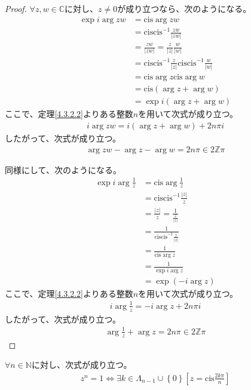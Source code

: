 \documentclass[dvipdfmx]{jsarticle}
\begin{document}
\begin{proof}
$\forall z,w \in \mathbb{C}$に対し、$z \neq 0$が成り立つなら、次のようになる。
\begin{align*}
\exp{i\arg{zw}} &= {\mathrm{cis}}{\arg{zw}}\\
&= {\mathrm{cis}}{{\mathrm{cis}}^{- 1}\frac{zw}{|zw|}}\\
&= \frac{zw}{|zw|} = \frac{z}{|z|}\frac{w}{|w|}\\
&= {\mathrm{cis}}{{\mathrm{cis}}^{- 1}\frac{z}{|z|}}{\mathrm{cis}}{{\mathrm{cis}}^{- 1}\frac{w}{|w|}}\\
&= {\mathrm{cis}}{\arg z}{\mathrm{cis}}{\arg w}\\
&= {\mathrm{cis}}\left( \arg z + \arg w \right)\\
&= \exp{i\left( \arg z + \arg w \right)}
\end{align*}
ここで、定理\ref{4.3.2.2}よりある整数$n$を用いて次式が成り立つ。
\begin{align*}
i\arg{zw} = i\left( \arg z + \arg w \right) + 2n\pi i
\end{align*}
したがって、次式が成り立つ。
\begin{align*}
\arg{zw} - \arg z - \arg w = 2n\pi \in 2\mathbb{Z}\pi
\end{align*}\par
同様にして、次のようになる。
\begin{align*}
\exp{i\arg\frac{1}{z}} &= {\mathrm{cis}}{\arg\frac{1}{z}}\\
&= {\mathrm{cis}}{{\mathrm{cis}}^{- 1}\frac{|z|}{z}}\\
&= \frac{|z|}{z} = \frac{1}{\frac{z}{|z|}}\\
&= \frac{1}{{\mathrm{cis}}{{\mathrm{cis}}^{- 1}\frac{z}{|z|}}}\\
&= \frac{1}{{\mathrm{cis}}{\arg z}}\\
&= \frac{1}{\exp{i\arg z}}\\
&= \exp\left( - i\arg z \right)
\end{align*}
ここで、定理\ref{4.3.2.2}よりある整数$n$を用いて次式が成り立つ。
\begin{align*}
i\arg\frac{1}{z} = - i\arg z + 2n\pi i
\end{align*}
したがって、次式が成り立つ。
\begin{align*}
\arg\frac{1}{z} + \arg z = 2n\pi \in 2\mathbb{Z}\pi
\end{align*}
\end{proof}
\begin{thm}\label{4.3.2.9} $\forall n \in \mathbb{N}$に対し、次式が成り立つ。
\begin{align*}
z^{n} = 1 \Leftrightarrow \exists k \in \varLambda_{n - 1} \cup \left\{ 0 \right\}\left[ z = {\mathrm{cis}}\frac{2k\pi}{n} \right]
\end{align*}
\end{thm}
\end{document}
